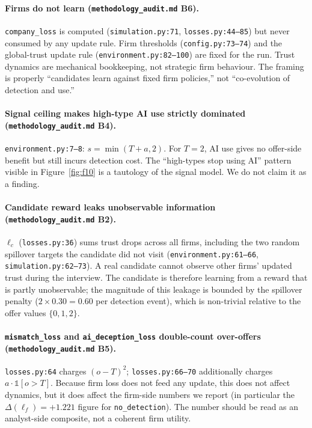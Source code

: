 \documentclass[11pt]{article}
\begin{document}
\paragraph{Firms do not learn (\texttt{methodology\_audit.md} B6).}
\texttt{company\_loss} is computed (\texttt{simulation.py:71},
\texttt{losses.py:44--85}) but never consumed by any update rule. Firm
thresholds (\texttt{config.py:73--74}) and the global-trust update rule
(\texttt{environment.py:82--100}) are fixed for the run. Trust dynamics
are mechanical bookkeeping, not strategic firm behaviour. The framing
is properly ``candidates learn against fixed firm policies,'' not
``co-evolution of detection and use.''

\paragraph{Signal ceiling makes high-type AI use strictly dominated
(\texttt{methodology\_audit.md} B4).}
\texttt{environment.py:7--8}: \(s = \min(T + a, 2)\). For \(T=2\), AI use
gives no offer-side benefit but still incurs detection cost. The
``high-types stop using AI'' pattern visible in Figure~\ref{fig:f10} is a
tautology of the signal model. We do not claim it as a finding.

\paragraph{Candidate reward leaks unobservable information
(\texttt{methodology\_audit.md} B2).}
\(\ell_{c}\) (\texttt{losses.py:36}) sums trust drops across all firms,
including the two random spillover targets the candidate did not visit
(\texttt{environment.py:61--66}, \texttt{simulation.py:62--73}).
A real candidate cannot observe other firms' updated trust during the
interview. The candidate is therefore learning from a reward that is
partly unobservable; the magnitude of this leakage is bounded by the
spillover penalty (\(2 \times 0.30 = 0.60\) per detection event), which is
non-trivial relative to the offer values \(\{0,1,2\}\).

\paragraph{\texttt{mismatch\_loss} and \texttt{ai\_deception\_loss}
double-count over-offers (\texttt{methodology\_audit.md} B5).}
\texttt{losses.py:64} charges \((o-T)^{2}\); \texttt{losses.py:66--70}
additionally charges \(a \cdot \mathbb{1}[o>T]\). Because firm loss does not
feed any update, this does not affect dynamics, but it does affect the
firm-side numbers we report (in particular the
\(\Delta(\ell_{f})=+1.221\) figure for \texttt{no\_detection}). The number
should be read as an analyst-side composite, not a coherent firm utility.
\end{document}

